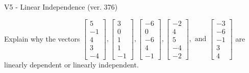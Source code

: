 \begin{exercise}
  \begin{exerciseTitle}V5 - Linear Independence (ver. 376)\end{exerciseTitle}
  \begin{exerciseStatement}
    Explain why the vectors \(\left[\begin{array}{r}
5 \\
-1 \\
4 \\
3 \\
-4
\end{array}\right] , \left[\begin{array}{r}
3 \\
0 \\
1 \\
1 \\
-1
\end{array}\right] , \left[\begin{array}{r}
-6 \\
0 \\
-6 \\
4 \\
-1
\end{array}\right] , \left[\begin{array}{r}
-2 \\
4 \\
5 \\
-4 \\
-2
\end{array}\right] , \text{ and } \left[\begin{array}{r}
-3 \\
-6 \\
-1 \\
3 \\
4
\end{array}\right]\) are linearly dependent or linearly independent.	



\end{exerciseStatement}
\end{exercise}
